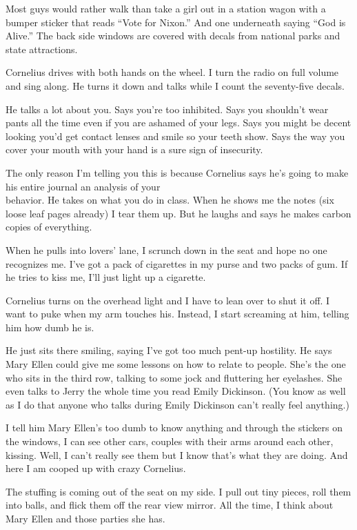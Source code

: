 \documentclass[
]{article}
\begin{document}
Most guys would rather walk than take a girl out in a station wagon with
a bumper sticker that reads ``Vote for Nixon.'' And one underneath
saying ``God is Alive.'' The back side windows are cov­ered with decals
from national parks and state attractions.

Cornelius drives with both hands on the wheel. I turn the radio on full
volume and sing along. He turns it down and talks while I count the
seventy-five decals.

He talks a lot about you. Says you're too inhibited. Says you shouldn't
wear pants all the time even if you are ashamed of your legs. Says you
might be decent looking you'd get contact lenses and smile so your teeth
show. Says the way you cover your mouth with your hand is a sure sign of
insecurity.

The only reason I'm telling you this is because Cornelius says he's
going to make his entire journal an analysis of your\\
behavior. He takes on what you do in class. When he shows me the notes
(six loose leaf pages already) I tear them up. But he laughs and says he
makes carbon copies of every­thing.

When he pulls into lovers' lane, I scrunch down in the seat and hope no
one recognizes me. I've got a pack of cigarettes in my purse and two
packs of gum. If he tries to kiss me, I'll just light up a cigarette.

Cornelius turns on the overhead light and I have to lean over to shut it
off. I want to puke when my arm touches his. Instead, I start screaming
at him, telling him how dumb he is.

He just sits there smiling, saying I've got too much pent-up hostility.
He says Mary Ellen could give me some lessons on how to relate to
people. She's the one who sits in the third row, talking to some jock
and fluttering her eyelashes. She even talks to Jerry the whole time you
read Emily Dickin­son. (You know as well as I do that anyone who talks
during Emily Dickinson can't really feel anything.)

I tell him Mary Ellen's too dumb to know anything and through the
stickers on the windows, I can see other cars, couples with their arms
around each other, kissing. Well, I can't really see them but I know
that's what they are doing. And here I am cooped up with crazy
Cornelius.

The stuffing is coming out of the seat on my side. I pull out tiny
pieces, roll them into balls, and flick them off the rear view mirror.
All the time, I think about Mary Ellen and those parties she has.
\end{document}
